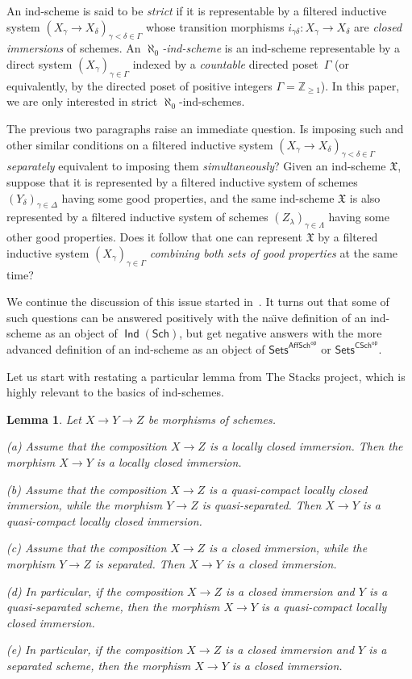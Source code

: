 \documentclass[12pt,a4paper]{amsart}
\newcommand{\+}{\protect\nobreakdash-}
\renewcommand{\:}{\colon}
\newcommand{\rarrow}{\longrightarrow}
\DeclareMathOperator{\Ind}{\mathsf{Ind}}
\newcommand{\Sets}{\mathsf{Sets}}
\newcommand{\Sch}{\mathsf{Sch}}
\newcommand{\AffSch}{\mathsf{AffSch}}
\newcommand{\CSch}{\mathsf{CSch}}
\newcommand{\sop}{\mathsf{op}}
\newcommand{\fX}{\mathfrak X}
\newcommand{\boZ}{\mathbb Z}
\theoremstyle{plain}
\newtheorem{lem}[thm]{Lemma}
\theoremstyle{definition}
\begin{document}
 An ind-scheme is said to be \emph{strict} if it is representable
by a filtered inductive system
$(X_\gamma\to X_\delta)_{\gamma<\delta\in\Gamma}$ whose transition
morphisms $i_{\gamma\delta}\:X_\gamma\rarrow X_\delta$ are
\emph{closed immersions} of schemes.
 An \emph{$\aleph_0$\+ind-scheme} is an ind-scheme representable by
a direct system $(X_\gamma)_{\gamma\in\Gamma}$ indexed by
a \emph{countable} directed poset~$\Gamma$ (or equivalently, by
the directed poset of positive integers $\Gamma=\boZ_{\ge1}$).
 In this paper, we are only interested in strict
$\aleph_0$\+ind-schemes.

 The previous two paragraphs raise an immediate question.
 Is imposing such and other similar conditions on a filtered inductive
system $(X_\gamma\to X_\delta)_{\gamma<\delta\in\Gamma}$
\emph{separately} equivalent to imposing them \emph{simultaneously}?
 Given an ind-scheme $\fX$, suppose that it is represented by
a filtered inductive system of schemes $(Y_\delta)_{\gamma\in\Delta}$
having some good properties, and the same ind-scheme $\fX$ is also
represented by a filtered inductive system of schemes
$(Z_\lambda)_{\gamma\in\Lambda}$ having some other good properties.
 Does it follow that one can represent $\fX$ by a filtered inductive
system $(X_\gamma)_{\gamma\in\Gamma}$ \emph{combining both sets of 
good properties} at the same time?

 We continue the discussion of this issue started
in~\cite[Section~1.2]{Psemten}.
 It turns out that some of such questions can be answered positively
with the na\"\i ve definition of an ind-scheme as an object of
$\Ind(\Sch)$, but get negative answers with the more advanced
definition of an ind-scheme as an object of $\Sets^{\AffSch^\sop}$
or $\Sets^{\CSch^\sop}$.

 Let us start with restating a particular lemma from The Stacks project,
which is highly relevant to the basics of ind-schemes.

\begin{lem} \label{loc-closed-immersion-cancellation-lemma}
 Let $X\rarrow Y\rarrow Z$ be morphisms of schemes. \par
\textup{(a)} Assume that the composition $X\rarrow Z$ is a locally
closed immersion.
 Then the morphism $X\rarrow Y$ is a locally closed immersion. \par
\textup{(b)} Assume that the composition $X\rarrow Z$ is
a quasi-compact locally closed immersion, while the morphism
$Y\rarrow Z$ is quasi-separated.
 Then $X\rarrow Y$ is a quasi-compact locally closed immersion. \par
\textup{(c)} Assume that the composition $X\rarrow Z$ is a closed
immersion, while the morphism $Y\rarrow Z$ is separated.
 Then $X\rarrow Y$ is a closed immersion. \par
\textup{(d)} In particular, if the composition $X\rarrow Z$ is
a closed immersion and $Y$ is a quasi-separated scheme, then
the morphism $X\rarrow Y$ is a quasi-compact locally closed
immersion. \par
\textup{(e)} In particular, if the composition $X\rarrow Z$ is
a closed immersion and $Y$ is a separated scheme, then
the morphism $X\rarrow Y$ is a closed immersion.
\end{lem}
\end{document}
